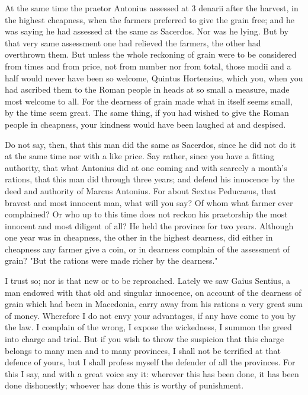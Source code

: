  At the same time the praetor Antonius assessed at 3 denarii after the harvest, in the highest cheapness, when the farmers preferred to give the grain free; and he was saying he had assessed at the same as Sacerdos. Nor was he lying. But by that very same assessment one had relieved the farmers, the other had overthrown them. But unless the whole reckoning of grain were to be considered from times and from price, not from number nor from total, those modii and a half would never have been so welcome, Quintus Hortensius, which you, when you had ascribed them to the Roman people in heads at so small a measure, made most welcome to all. For the dearness of grain made what in itself seems small, by the time seem great. The same thing, if you had wished to give the Roman people in cheapness, your kindness would have been laughed at and despised.

 Do not say, then, that this man did the same as Sacerdos, since he did not do it at the same time nor with a like price. Say rather, since you have a fitting authority, that what Antonius did at one coming and with scarcely a month's rations, that this man did through three years; and defend his innocence by the deed and authority of Marcus Antonius. For about Sextus Peducaeus, that bravest and most innocent man, what will you say? Of whom what farmer ever complained? Or who up to this time does not reckon his praetorship the most innocent and most diligent of all? He held the province for two years. Although one year was in cheapness, the other in the highest dearness, did either in cheapness any farmer give a coin, or in dearness complain of the assessment of grain? "But the rations were made richer by the dearness."

 I trust so; nor is that new or to be reproached. Lately we saw Gaius Sentius, a man endowed with that old and singular innocence, on account of the dearness of grain which had been in Macedonia, carry away from his rations a very great sum of money. Wherefore I do not envy your advantages, if any have come to you by the law. I complain of the wrong, I expose the wickedness, I summon the greed into charge and trial. But if you wish to throw the suspicion that this charge belongs to many men and to many provinces, I shall not be terrified at that defence of yours, but I shall profess myself the defender of all the provinces. For this I say, and with a great voice say it: wherever this has been done, it has been done dishonestly; whoever has done this is worthy of punishment.


